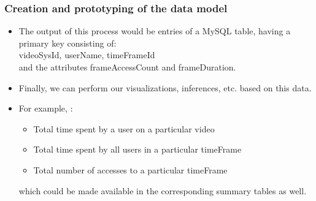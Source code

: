 \documentclass[12pt,xcolor=dvipsnames]{beamer}
\begin{document}
\begin{frame}[t]
\frametitle{Creation and prototyping of the data model}

\begin{itemize}
\item The output of this process would be entries of a MySQL table, having a primary key consisting of:\\videoSysId, userName, timeFrameId\\and the attributes frameAccessCount and frameDuration.

\item Finally, we can perform our visualizations, inferences, etc. based on this data.

\item For example, :

\begin{itemize}
\item Total time spent by a user on a particular video
\item Total time spent by all users in a particular timeFrame
\item Total number of accesses to a particular timeFrame
\end{itemize}

which could be made available in the corresponding summary tables as well.
\end{itemize}

\end{frame}
\end{document}
